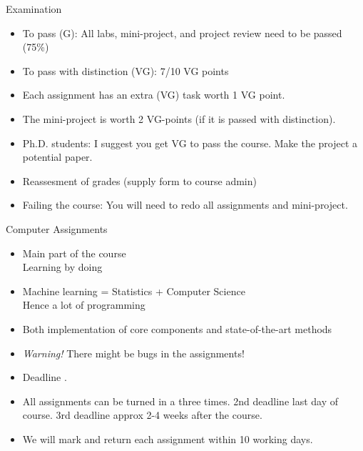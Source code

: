 \documentclass[10pt]{beamer}
\begin{document}
\begin{frame}{Examination}

\begin{itemize}
\item To pass (G): All labs, mini-project, and project review need to be passed (75\%)\pause
\item To pass with distinction (VG): 7/10 VG points\pause
\item Each assignment has an extra (VG) task worth 1 VG point.\pause
\item The mini-project is worth 2 VG-points (if it is passed with distinction).
\item Ph.D. students: I suggest you get VG to pass the course. Make the project a potential paper.
\item Reassesment of grades (supply form to course admin)
\item Failing the course: You will need to redo all assignments and mini-project.
\end{itemize}

\end{frame}


\begin{frame}{Computer Assignments}

\begin{itemize}
\item Main part of the course\\Learning by doing
\item Machine learning = Statistics + Computer Science\\Hence a lot of programming\pause
\item Both implementation of core components and state-of-the-art methods\pause
\item \emph{Warning!} There might be bugs in the assignments! \pause
\item Deadline .\pause
\item All assignments can be turned in a three times. 2nd deadline last day of course. 3rd deadline approx 2-4 weeks after the course. \pause
\item We will mark and return each assignment within 10 working days.
\end{itemize}
\end{frame}
\end{document}
